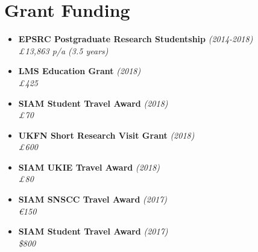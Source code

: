 \documentclass[10pt,a4paper,sans]{moderncv}        %
\begin{document}
	\section{Grant Funding}
		
		\vspace{6pt}
		
		\begin{itemize}
			
			\item \textbf{EPSRC Postgraduate Research Studentship} \hfill \textit{(2014-2018)} \\
			\textit{£13,863 p/a (3.5 years)}
			
			\vspace{2pt}
			
			\item \textbf{LMS Education Grant} \hfill\textit{(2018)}\\
			\textit{£425}
			
			\vspace{2pt}
			
			\item \textbf{SIAM Student Travel Award} \hfill\textit{(2018)}\\
			\textit{£70}
			
			\vspace{2pt}
			
			\item \textbf{UKFN Short Research Visit Grant} \hfill\textit{(2018)}\\
			\textit{£600}
			
			\vspace{2pt}
			
			\item \textbf{SIAM UKIE Travel Award} \hfill\textit{(2018)}\\
			\textit{£80}
			
			\vspace{2pt}
			
			\item \textbf{SIAM SNSCC Travel Award} \hfill \textit{(2017)}\\
			\textit{\euro{}150}
			
			\vspace{2pt}
			
			\item \textbf{SIAM Student Travel Award} \hfill\textit{(2017)}\\
			\textit{\$800}
			
			\vspace{2pt}
			

\end{itemize}
\end{document}
